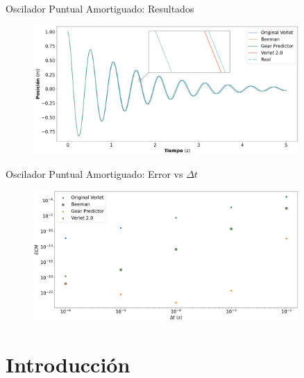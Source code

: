 \documentclass{beamer}
\begin{document}
        \begin{frame}{Oscilador Puntual Amortiguado: Resultados}
            \begin{figure}[H!]
                \includegraphics[width=0.9\textwidth]{./oscilador_resultados}
                \label{fig:oscilador_1}
            \end{figure}
        \end{frame}

        \begin{frame}{Oscilador Puntual Amortiguado: Error vs $\Delta t$}
            \begin{figure}[H!]
                \includegraphics[width=0.9\textwidth]{./oscilador_error}
                \label{fig:oscilador_2}
            \end{figure}
        \end{frame}


    \section{Introducción}
\end{document}
